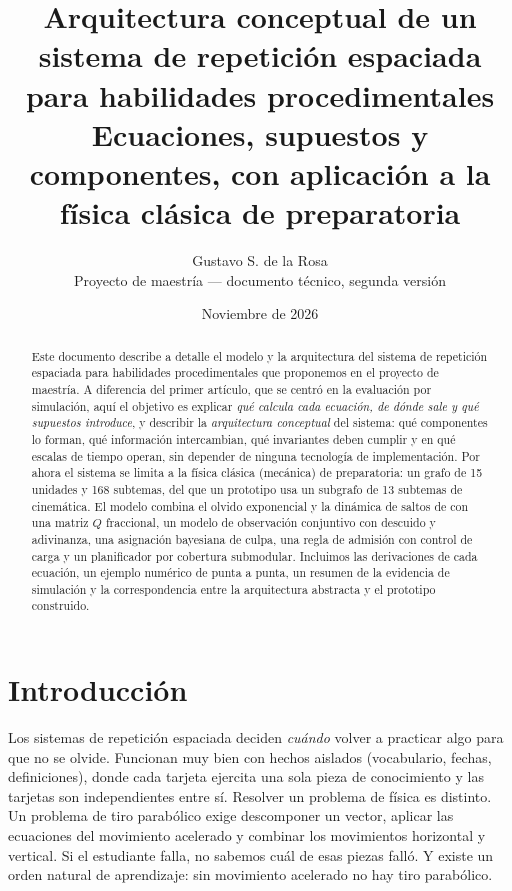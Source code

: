 \documentclass[11pt]{article}
\title{\textbf{Arquitectura conceptual de un sistema de repetición espaciada para habilidades procedimentales}\\[4pt]
\large Ecuaciones, supuestos y componentes, con aplicación a la física clásica de preparatoria}
\author{Gustavo S. de la Rosa\\[2pt]\small Proyecto de maestría --- documento técnico, segunda versión}
\date{Noviembre de 2026}
\theoremstyle{definition}
\theoremstyle{remark}
\begin{document}
\maketitle

\begin{abstract}
\noindent Este documento describe a detalle el modelo y la arquitectura del sistema de repetición espaciada para habilidades procedimentales que proponemos en el proyecto de maestría. A diferencia del primer artículo, que se centró en la evaluación por simulación, aquí el objetivo es explicar \emph{qué calcula cada ecuación, de dónde sale y qué supuestos introduce}, y describir la \emph{arquitectura conceptual} del sistema: qué componentes lo forman, qué información intercambian, qué invariantes deben cumplir y en qué escalas de tiempo operan, sin depender de ninguna tecnología de implementación. Por ahora el sistema se limita a la física clásica (mecánica) de preparatoria: un grafo de 15 unidades y 168 subtemas, del que un prototipo usa un subgrafo de 13 subtemas de cinemática. El modelo combina el olvido exponencial y la dinámica de saltos de \citet{tabibian2019} con una matriz $Q$ fraccional, un modelo de observación conjuntivo con descuido y adivinanza, una asignación bayesiana de culpa, una regla de admisión con control de carga y un planificador por cobertura submodular. Incluimos las derivaciones de cada ecuación, un ejemplo numérico de punta a punta, un resumen de la evidencia de simulación y la correspondencia entre la arquitectura abstracta y el prototipo construido.
\end{abstract}

\tableofcontents
\bigskip

\section{Introducción}

Los sistemas de repetición espaciada deciden \emph{cuándo} volver a practicar algo para que no se olvide. Funcionan muy bien con hechos aislados (vocabulario, fechas, definiciones), donde cada tarjeta ejercita una sola pieza de conocimiento y las tarjetas son independientes entre sí. Resolver un problema de física es distinto. Un problema de tiro parabólico exige descomponer un vector, aplicar las ecuaciones del movimiento acelerado y combinar los movimientos horizontal y vertical. Si el estudiante falla, no sabemos cuál de esas piezas falló. Y existe un orden natural de aprendizaje: sin movimiento acelerado no hay tiro parabólico.
\end{document}
